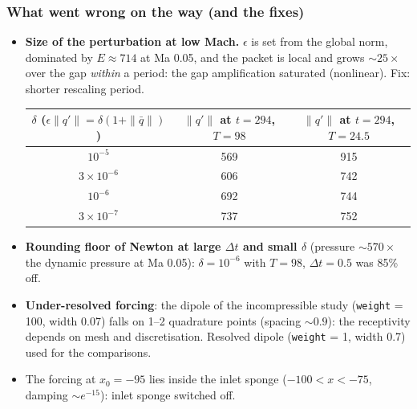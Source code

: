 \documentclass[
  aspectratio=169,
  t,
  onlytextwidth,
  10pt,
]{beamer}
\newcommand{\qb}{\bar{q}}
\begin{document}
\begin{frame}
	\frametitle{What went wrong on the way (and the fixes)}
	\small
	\begin{itemize}
		\item \textbf{Size of the perturbation at low Mach.} $\epsilon$ is set from the global norm, dominated by $E\approx714$ at Ma 0.05, and the packet is local and grows $\sim25\times$ over the gap \emph{within} a period: the gap amplification saturated (nonlinear). Fix: shorter rescaling period.
		      \begin{center}\footnotesize
			      \begin{tabular}{ccc}
				      \toprule
				      $\delta$ ($\epsilon\|q'\|=\delta(1+\|\qb\|)$) & $\|q'\|$ at $t=294$, $T=98$ & $\|q'\|$ at $t=294$, $T=24.5$ \\
				      \midrule
				      $10^{-5}$          & 569 & 915 \\
				      $3\times10^{-6}$   & 606 & 742 \\
				      $10^{-6}$          & 692 & 744 \\
				      $3\times10^{-7}$   & 737 & 752 \\
				      \bottomrule
			      \end{tabular}
		      \end{center}
		\item \textbf{Rounding floor of Newton at large $\Delta t$ and small $\delta$} (pressure $\sim570\times$ the dynamic pressure at Ma 0.05): $\delta=10^{-6}$ with $T=98$, $\Delta t=0.5$ was 85\% off.
		\item \textbf{Under-resolved forcing}: the dipole of the incompressible study (\texttt{weight} = 100, width 0.07) falls on 1--2 quadrature points (spacing $\sim0.9$): the receptivity depends on mesh and discretisation. Resolved dipole (\texttt{weight} = 1, width 0.7) used for the comparisons.
		\item The forcing at $x_0=-95$ lies inside the inlet sponge ($-100<x<-75$, damping $\sim e^{-15}$): inlet sponge switched off.
	\end{itemize}
\end{frame}
\end{document}
